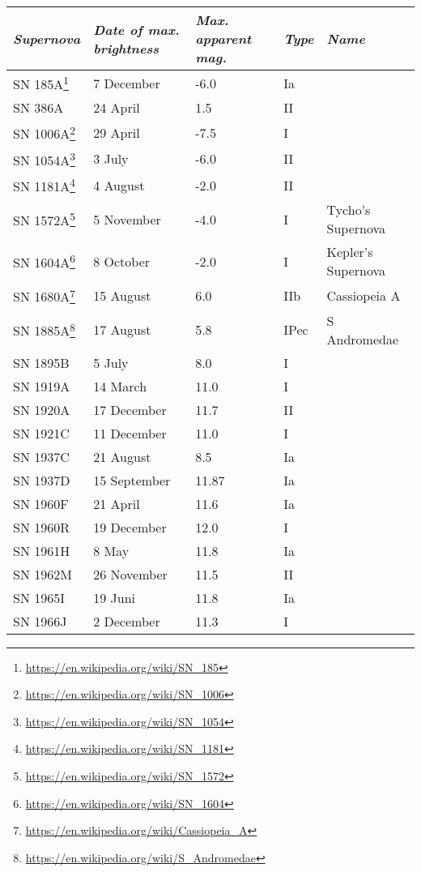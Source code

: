 \begin{longtable}{l|l|l|l|l}\toprule
\emph{Supernova}            & \emph{Date of max. brightness} & \emph{Max. apparent mag.} & \emph{Type} & \emph{Name} \\\midrule
SN 185A\footnote{\url{https://en.wikipedia.org/wiki/SN_185}} & 7 December & -6.0 & Ia & \\\midrule
SN 386A & 24 April & 1.5 & II & \\\midrule
SN 1006A\footnote{\url{https://en.wikipedia.org/wiki/SN_1006}} & 29 April & -7.5 & I & \\\midrule
SN 1054A\footnote{\url{https://en.wikipedia.org/wiki/SN_1054}} & 3 July & -6.0 & II & \\\midrule
SN 1181A\footnote{\url{https://en.wikipedia.org/wiki/SN_1181}} & 4 August & -2.0 & II & \\\midrule
SN 1572A\footnote{\url{https://en.wikipedia.org/wiki/SN_1572}} & 5 November & -4.0 & I & Tycho's Supernova\\\midrule
SN 1604A\footnote{\url{https://en.wikipedia.org/wiki/SN_1604}} & 8 October & -2.0 & I & Kepler's Supernova\\\midrule
SN 1680A\footnote{\url{https://en.wikipedia.org/wiki/Cassiopeia_A}} & 15 August & 6.0 & IIb & Cassiopeia A\\\midrule
SN 1885A\footnote{\url{https://en.wikipedia.org/wiki/S_Andromedae}} & 17 August & 5.8 & IPec & S Andromedae\\\midrule
SN 1895B &  5 July      & 8.0   & I   & \\\midrule
SN 1919A & 14 March     & 11.0  & I   & \\\midrule
SN 1920A & 17 December  & 11.7  & II  & \\%
SN 1921C & 11 December  & 11.0  & I   & \\\midrule
SN 1937C & 21 August    & 8.5   & Ia  & \\%
SN 1937D & 15 September & 11.87 & Ia  & \\\midrule
SN 1960F & 21 April     & 11.6  & Ia  & \\%
SN 1960R & 19 December  & 12.0  & I   & \\%
SN 1961H &  8 May       & 11.8  & Ia  & \\%
SN 1962M & 26 November  & 11.5  & II  & \\%
SN 1965I & 19 Juni      & 11.8  & Ia  & \\%
SN 1966J &  2 December  & 11.3  & I   & \\%

\end{longtable}

